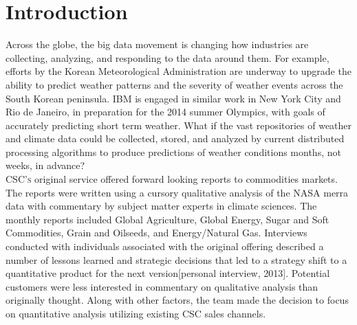 \section{Introduction}
Across the globe, the big data movement is changing how industries are collecting, analyzing, and responding to the data around them. For example, efforts by the Korean Meteorological Administration are underway to upgrade the ability to predict weather patterns and the severity of weather events across the South Korean peninsula. IBM is engaged in similar work in New York City and Rio de Janeiro, in preparation for the 2014 summer Olympics, with goals of accurately predicting short term weather\cite{rwe}. What if the vast repositories of weather and climate data could be collected, stored, and analyzed by current distributed processing algorithms to produce predictions of weather conditions months, not weeks, in advance?\\

\textsc{CSC's} original \climatedge service offered forward looking reports to commodities markets. The reports were written using  a cursory qualitative analysis of the NASA \gls{merra} data with commentary by subject matter experts in climate sciences. The monthly reports included Global Agriculture, Global Energy, Sugar and Soft Commodities, Grain and Oilseeds, and Energy/Natural Gas\cite{climatedgeurl}. Interviews conducted with  individuals associated with the original \climatedge offering described a number of lessons learned and strategic decisions that led to a strategy shift to a quantitative product for the next version[personal interview, 2013]. Potential customers were less interested in commentary on qualitative analysis than originally thought. Along with other factors, the \climatedge team made the decision to focus on quantitative analysis utilizing existing CSC sales channels. \\

